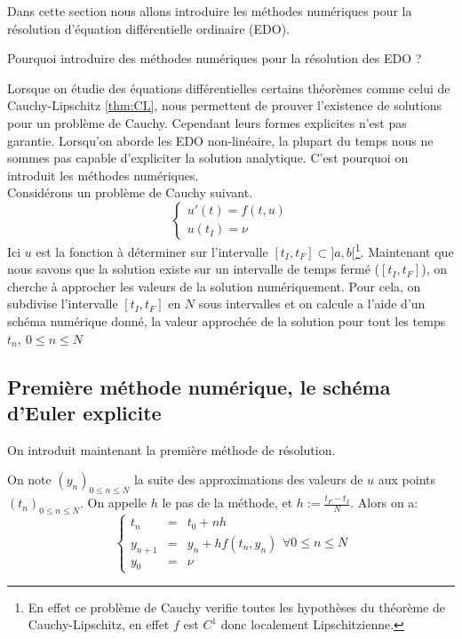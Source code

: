 \documentclass{article}
\newtheorem[M , nocut]{prop}{Proposition}[section]
\newtheorem[M , nocut]{definition}{Définition}
\newtheorem[M , nocut]{lemme}{Lemme}
\newtheorem[L , nocut]{thm}{Théoreme}
\newtheorem[M , nocut]{cor}{Corollaire}
\begin{document}
Dans cette section nous allons introduire les méthodes numériques pour la résolution d'équation différentielle ordinaire (EDO). 
\begin{example}[Problématique]
    Pourquoi introduire des méthodes numériques pour la résolution des EDO ? 
\end{example}
Lorsque on étudie des équations différentielles certains théorèmes comme celui de Cauchy-Lipschitz \ref{thm:CL}, nous permettent de prouver l'existence de solutions pour un problème de Cauchy. Cependant leurs formes explicites n'est pas garantie. Lorsqu'on aborde les EDO non-linéaire, la plupart du temps nous ne sommes pas capable d'expliciter la solution analytique. C'est pourquoi on introduit les méthodes numériques.\\
Considérons un problème de Cauchy suivant.
\[
    \left\{\begin{array}{l}
        u'(t)=f(t,u)\\
        u(t_I) = \nu
    \end{array}\right.
\]
Ici $u$ est la fonction à déterminer sur l'intervalle $[t_I,t_F] \subset ]a,b[$\footnote{En effet ce problème de Cauchy verifie toutes les hypothèses du théorème de Cauchy-Lipschitz, en effet $f$ est $C^1$ donc localement Lipschitzienne.}.
Maintenant que nous savons que la solution existe sur un intervalle de temps fermé ($[t_I,t_F]$), on cherche à approcher les valeurs de la solution numériquement. Pour cela, on subdivise l'intervalle $[t_I,t_F]$ en $N$ sous intervalles et on calcule a l'aide d'un schéma numérique donné, la valeur approchée de la solution pour tout les temps $t_n,\ 0\le n \le N$

\subsection*{Première méthode numérique, le schéma d'Euler explicite}

On introduit maintenant la première méthode de résolution.
\begin{definition}
    On note $(y_n)_{0 \le n \le N}$ la suite des approximations des valeurs de $u$ aux points $(t_n)_{0 \le n \le N}$. On appelle $h$ le pas de la méthode, et $h:= \frac{t_F-t_I}{N}$. Alors on a:
    \[
        \left\{\begin{array}{rcl}
        t_n &=& t_0 + n h \\
        y_{n+1} &=& y_n + h f(t_n,y_n)\\
        y_0 &=& \nu
        \end{array}\right. \forall 0 \le n \le N
    \]
\end{definition}
\end{document}
